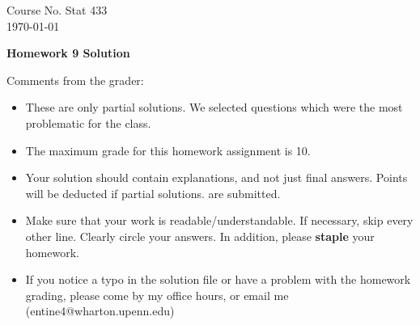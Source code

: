 \documentclass[10pt,a4paper]{article}
\begin{document}
\begin{flushleft}
Course No. Stat 433 \\
\today
\end{flushleft}

\begin{center}
{\Large{\bf  Homework 9 Solution}}
\end{center}

\textcolor[rgb]{0.98,0.00,0.00}{Comments from the grader:}
\begin{itemize}
    \item \textcolor[rgb]{0.98,0.00,0.00}{These are only partial solutions.  We selected
    questions which were the most problematic for the class.}
    \item \textcolor[rgb]{0.98,0.00,0.00}{The maximum grade for this homework assignment is 10.}
    \item \textcolor[rgb]{0.98,0.00,0.00}{Your solution should contain explanations, and not just
    final answers. Points will be deducted if partial solutions.
    are submitted.}
    \item \textcolor[rgb]{0.98,0.00,0.00}{Make sure that your work is readable/understandable.  If necessary, skip every other line.  Clearly circle your answers.  In addition, please {\bf staple} your homework.}
    \item \textcolor[rgb]{0.98,0.00,0.00}{If you notice a typo in the solution file or have a problem with the homework
    grading, please come by my office hours, or email me (entine4@wharton.upenn.edu)}

\end{itemize}
\end{document}
